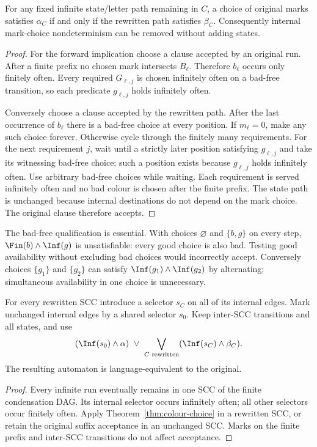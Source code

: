 \begin{theorem}
\label{thm:colour-choice}
For any fixed infinite state/letter path remaining in $C$, a choice of
original marks satisfies $\alpha_C$ if and only if the rewritten path
satisfies $\beta_C$. Consequently internal mark-choice nondeterminism
can be removed without adding states.
\end{theorem}
\begin{proof}
For the forward implication choose a clause accepted by an original run.
After a finite prefix no chosen mark intersects $B_\ell$. Therefore
$b_\ell$ occurs only finitely often. Every required $G_{\ell,j}$ is
chosen infinitely often on a bad-free transition, so each predicate
$g_{\ell,j}$ holds infinitely often.

Conversely choose a clause accepted by the rewritten path. After the
last occurrence of $b_\ell$ there is a bad-free choice at every position.
If $m_\ell=0$, make any such choice forever. Otherwise cycle through the
finitely many requirements. For the next requirement $j$, wait until a
strictly later position satisfying $g_{\ell,j}$ and take its witnessing
bad-free choice; such a position exists because $g_{\ell,j}$ holds
infinitely often. Use arbitrary bad-free choices while waiting. Each
requirement is served infinitely often and no bad colour is chosen
after the finite prefix. The state path is unchanged because internal
destinations do not depend on the mark choice. The original clause
therefore accepts.
\end{proof}

The bad-free qualification is essential. With choices $\varnothing$ and
$\{b,g\}$ on every step, $\Fin(b)\land\Inf(g)$ is unsatisfiable:
every good choice is also bad. Testing good availability without excluding
bad choices would incorrectly accept. Conversely choices $\{g_1\}$ and
$\{g_2\}$ can satisfy $\Inf(g_1)\land\Inf(g_2)$ by alternating;
simultaneous availability in one choice is unnecessary.

\begin{corollary}
For every rewritten SCC introduce a selector $s_C$ on all of its internal
edges. Mark unchanged internal edges by a shared selector $s_0$. Keep
inter-SCC transitions and all states, and use
\[
 (\Inf(s_0)\land\alpha)\ \lor\
 \bigvee_{C\text{ rewritten}}(\Inf(s_C)\land\beta_C).
\]
The resulting automaton is language-equivalent to the original.
\end{corollary}
\begin{proof}
Every infinite run eventually remains in one SCC of the finite condensation
DAG. Its internal selector occurs infinitely often; all other selectors
occur finitely often. Apply Theorem~\ref{thm:colour-choice} in a rewritten
SCC, or retain the original suffix acceptance in an unchanged SCC. Marks
on the finite prefix and inter-SCC transitions do not affect acceptance.
\end{proof}

